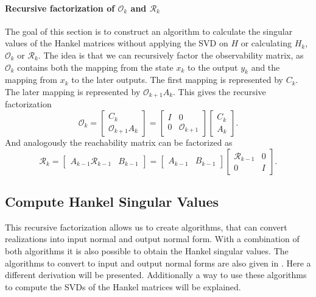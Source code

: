 \documentclass[doctype=mastersthesis,BCOR=15mm,biblatex]{ldvbook}%
\newcommand{\R}{\mathcal{R}} %
\newcommand{\Ob}{\mathcal{O}} %
\newcommand{\eye}{I} %
\begin{document}
\paragraph{Recursive factorization of $\Ob_k$ and  $\R_k$}
The goal of this section is to construct an algorithm to calculate the singular values of the Hankel matrices without applying the SVD on $H$ or calculating $H_k$, $\Ob_k$ or $\R_k$.
The idea is that we can recursively factor the observability matrix, as $\Ob_k$ contains both the mapping from the state $x_k$ to the output $y_k$ and the mapping from $x_k$ to the later outputs.
The first mapping is represented by $C_k$.
The later mapping is represented by $\Ob_{k+1}A_k$.
This gives the recursive factorization
\begin{equation}\label{eq:decomp_O}
	\Ob_k = 
	\begin{bmatrix}
	C_k\\
	\Ob_{k+1}A_k
	\end{bmatrix}
	=
	\begin{bmatrix}
	\eye& 0 \\
	0& \Ob_{k+1}
	\end{bmatrix}
	\begin{bmatrix}
	C_k\\
	A_k
	\end{bmatrix}
	.
\end{equation}
And analogously the reachability matrix can be factorized as
\begin{equation}\label{eq:decomp_R}
	\R_k = 
	\begin{bmatrix}
	A_{k-1} \R_{k-1} & B_{k-1}
	\end{bmatrix}
	=
	\begin{bmatrix}
	A_{k-1} & B_{k-1}
	\end{bmatrix}
	\begin{bmatrix}
	\R_{k-1} &0\\
	0& \eye
	\end{bmatrix}
	.
\end{equation}

\subsection{Compute Hankel Singular Values}
This recursive factorization allows us to create algorithms, that can convert realizations into input normal and output normal form.
With a combination of both algorithms it is also possible to obtain the Hankel singular values.
The algorithms to convert to input and output normal forms are also given in \cite{chandrasekaran_fast_2005}.
Here a different derivation will be presented. Additionally a way to use these algorithms to compute the SVDs of the Hankel matrices will be explained. 
\end{document}
